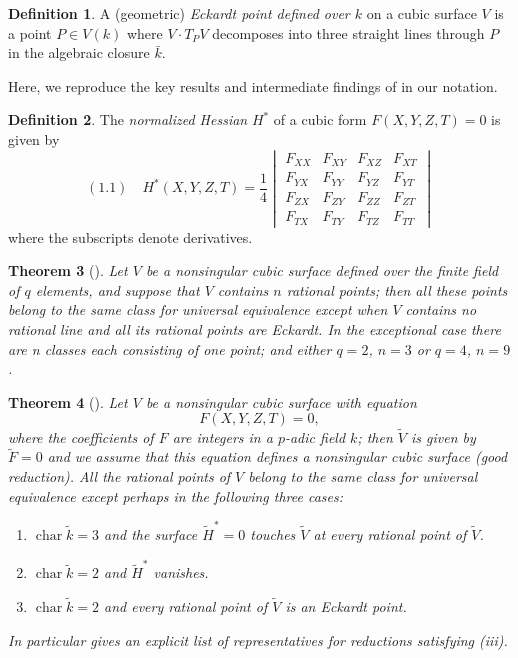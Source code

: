 \documentclass[11pt]{article}
\newtheorem{theorem}{Theorem}[section] %
\theoremstyle{definition}
\newtheorem{definition}[theorem]{Definition}
\DeclareMathOperator{\Char}{char}
\begin{document}
\begin{definition}
A (geometric) \textit{Eckardt point defined over $k$} on a cubic surface $V$ is a point $P \in V(k)$ where $V \cdot T_P V$ decomposes into three straight lines through $P$ in the algebraic closure $\bar{k}$. 
\end{definition}

Here, we reproduce the key results and intermediate findings of \cite{swinnertondyer} in our notation. 

\begin{definition}
The \textit{normalized Hessian} $H^*$ of a cubic form $F(X, Y, Z, T) = 0$ is given by
\[
(1.1) \quad H^*(X, Y, Z, T) = \frac{1}{4}
\begin{vmatrix}
F_{XX} & F_{XY} & F_{XZ} & F_{XT} \\
F_{YX} & F_{YY} & F_{YZ} & F_{YT} \\
F_{ZX} & F_{ZY} & F_{ZZ} & F_{ZT} \\
F_{TX} & F_{TY} & F_{TZ} & F_{TT}
\end{vmatrix}
\]
where the subscripts denote derivatives.
\end{definition}

\begin{theorem}[{\cite[Thm.~1]{swinnertondyer}}]
\label{thm:swd-1}
Let $V$ be a nonsingular cubic surface defined over the
finite field of $q$ elements, and suppose that $V$ contains $n$ rational points;
then all these points belong to the same class for universal equivalence
except when $V$ contains no rational line and all its rational points are
Eckardt. In the exceptional case there are n classes each consisting of
one point; and either $q = 2$, $n = 3$ or $q = 4$, $n = 9$.
\end{theorem}

\begin{theorem}[{\cite[Thm.~2]{swinnertondyer}}]
\label{thm:swd-2}
Let $V$ be a nonsingular cubic surface with equation $$F(X, Y, Z, T) = 0,$$
where the coefficients of $F$ are integers in a $p$-adic field $k$; then $\tilde{V}$ is given by $\tilde{F}=0$
and we assume that this equation defines a nonsingular cubic surface (good reduction). All the rational
points of $V$ belong to the same class for universal equivalence except perhaps in the following three cases:
\begin{enumerate}[label=(\roman*)]
    \item $\Char{\tilde{k}} = 3$ and the surface $\tilde{H}^* = 0$ touches $\tilde{V}$ at every rational point of $\tilde{V}$.
    \item $\Char{\tilde{k}} = 2$ and $\tilde{H}^*$ vanishes.
    \item $\Char{\tilde{k}} = 2$ and every rational point of $\tilde{V}$ is an Eckardt point.
\end{enumerate}
In particular \cite[\S 5]{swinnertondyer} gives an explicit list of representatives for reductions satisfying (iii).
\end{theorem}
\end{document}
